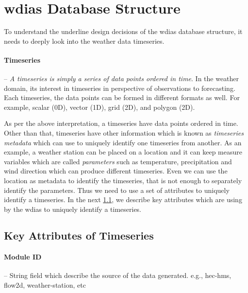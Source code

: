 \section{\acrshort{wdias} Database Structure}
\label{se:db_struct}

To understand the underline design decisions of the \acrshort{wdias} database structure, it needs to deeply look into the weather data timeseries.
\paragraph{Timeseries}-- \emph{A timeseries is simply a series of data points ordered in time}. In the weather domain, its interest in timeseries in perspective of observations to forecasting. Each timeseries, the data points can be formed in different formats as well. For example, scalar (0D), vector (1D), grid (2D), and polygon (2D).

As per the above interpretation, a timeseries have data points ordered in time. Other than that, timeseries have other information which is known as \emph{timeseries metadata} which can use to uniquely identify one timeseries from another. As an example, a weather station can be placed on a location and it can keep measure variables which are called \emph{parameters} such as temperature, precipitation and wind direction which can produce different timeseries. Even we can use the location as metadata to identify the timeseries, that is not enough to separately identify the parameters. Thus we need to use a set of attributes to uniquely identify a timeseries. In the next \cref{subse:timeseries_key_attributes}, we describe key attributes which are using by the \acrshort{wdias} to uniquely identify a timeseries.


\subsection{Key Attributes of Timeseries}
\label{subse:timeseries_key_attributes}
\paragraph{Module ID}-- String field which describe the source of the data generated. e.g., hec-hms, flow2d, weather-station, etc


